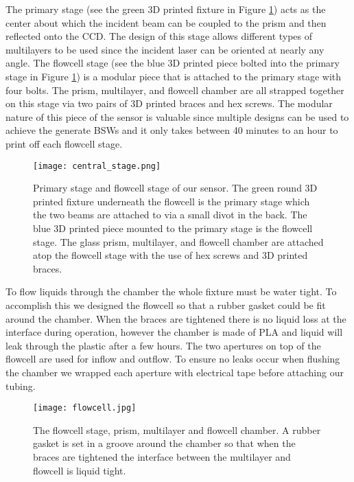 The primary stage (see the green 3D printed fixture in Figure \ref{fig:centralstage}) acts as the center about which the incident beam can be coupled to the prism and then reflected onto the CCD. The design of this stage allows different types of multilayers to be used since the incident laser can be oriented at nearly any angle. The flowcell stage (see the blue 3D printed piece bolted into the primary stage in Figure \ref{fig:centralstage}) is a modular piece that is attached to the primary stage with four bolts. The prism, multilayer, and flowcell chamber are all strapped together on this stage via two pairs of 3D printed braces and hex screws. The modular nature of this piece of the sensor is valuable since multiple designs can be used to achieve the generate BSWs and it only takes between 40 minutes to an hour to print off each flowcell stage.

\begin{figure}[h]
\begin{center}
    \texttt{[image: central\_stage.png]}
    \caption{Primary stage and flowcell stage of our sensor. The green round 3D printed fixture underneath the flowcell is the primary stage which the two beams are attached to via a small divot in the back. The blue 3D printed piece mounted to the primary stage is the flowcell stage. The glass prism, multilayer, and flowcell chamber are attached atop the flowcell stage with the use of hex screws and 3D printed braces.}
    \label{fig:centralstage}
\end{center}
\end{figure}


To flow liquids through the chamber the whole fixture must be water tight. To accomplish this we designed the flowcell so that a rubber gasket could be fit around the chamber. When the braces are tightened there is no liquid loss at the interface during operation, however the chamber is made of PLA and liquid will leak through the plastic after a few hours. The two apertures on top of the flowcell are used for inflow and outflow. To ensure no leaks occur when flushing the chamber we wrapped each aperture with electrical tape before attaching our tubing. 

\begin{figure}[h]
\begin{center}
    \texttt{[image: flowcell.jpg]}
    \caption{The flowcell stage, prism, multilayer and flowcell chamber. A rubber gasket is set in a groove around the chamber so that when the braces are tightened the interface between the multilayer and flowcell is liquid tight.}
    \label{fig:flowcellstage}
\end{center}
\end{figure}

